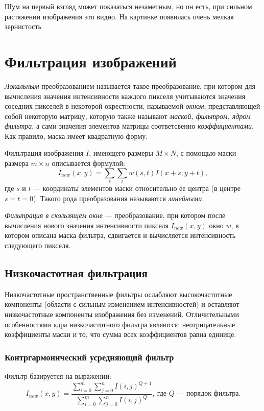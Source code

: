 Шум на первый взгляд может показаться незаметным, но он есть, при сильном растяжении изображения это видно. На картинке появилась очень мелкая зернистость

\section{Фильтрация изображений}
\textit{Локальным} преобразованием называется такое преобразование, при котором для вычисления значения интенсивности каждого пикселя учитываются значения соседних пикселей в некоторой окрестности, называемой \textit{окном}, представляющей собой некоторую матрицу, которую также называют \textit{маской, фильтром, ядром фильтра}, а сами значения элементов
матрицы соответсвенно \textit{коэффициентами}. Как правило, маска имеет квадратную форму.

Фильтрация изображения $I$, имеющего размеры $M \times N$, с помощью маски размера $m \times n$ описывается формулой:
\begin{equation}
    I_{new}(x,y) = \sum_s \sum_t w(s,t) I(x+s,y+t),
\end{equation}
где $s$ и $t$ — координаты элементов маски относительно ее центра (в
центре $s = t = 0$). Такого рода преобразования называются \textit{линейными}.

\textit{Фильтрация в скользящем окне} — преобразование, при котором после вычисления нового значения интенсивности пикселя $I_{new}(x,y)$ окно $w$, в котором описана маска фильтра, сдвигается и
вычисляется интенсивность следующего пикселя.

\subsection{Низкочастотная фильтрация}
Низкочастотные пространственные фильтры ослабляют высокочастотные компоненты (области с сильным изменением интенсивностей) и оставляют низкочастотные компоненты изображения
без изменений. Отличительными особенностями
ядра низкочастотного фильтра являются: неотрицательные коэффициенты маски и то, что сумма всех коэффициентов равна единице.

\subsubsection{Контргармонический усредняющий фильтр}
Фильтр базируется на выражении:
\begin{equation}
    I_{new}(x,y) = \frac{\sum_{i=0}^m \sum_{j=0}^n I(i,j)^{Q+1}}{\sum_{i=0}^m \sum_{j=0}^n I(i,j)^Q}, \: \text{где $Q$ — порядок фильтра.}
\end{equation}


